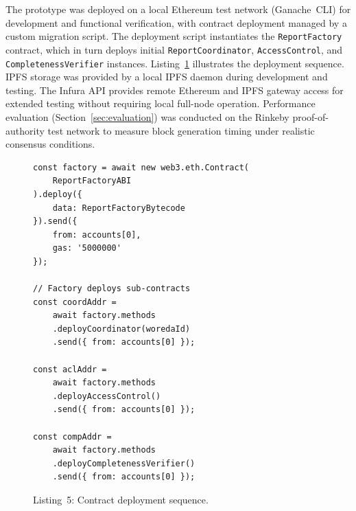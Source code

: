 The prototype was deployed on a local Ethereum test network (Ganache~CLI) for development and functional verification, with contract deployment managed by a custom migration script. The deployment script instantiates the \texttt{ReportFactory} contract, which in turn deploys initial \texttt{ReportCoordinator}, \texttt{AccessControl}, and \texttt{CompletenessVerifier} instances. Listing~\ref{lst:deploy} illustrates the deployment sequence. IPFS storage was provided by a local IPFS daemon during development and testing. The Infura API provides remote Ethereum and IPFS gateway access for extended testing without requiring local full-node operation. Performance evaluation (Section~\ref{sec:evaluation}) was conducted on the Rinkeby proof-of-authority test network to measure block generation timing under realistic consensus conditions.

\begin{figure}[!ht]
\begin{verbatim}
const factory = await new web3.eth.Contract(
    ReportFactoryABI
).deploy({
    data: ReportFactoryBytecode
}).send({
    from: accounts[0],
    gas: '5000000'
});

// Factory deploys sub-contracts
const coordAddr =
    await factory.methods
    .deployCoordinator(woredaId)
    .send({ from: accounts[0] });

const aclAddr =
    await factory.methods
    .deployAccessControl()
    .send({ from: accounts[0] });

const compAddr =
    await factory.methods
    .deployCompletenessVerifier()
    .send({ from: accounts[0] });
\end{verbatim}
\caption*{Listing~5: Contract deployment sequence.}\label{lst:deploy}
\end{figure}

%
%
%

